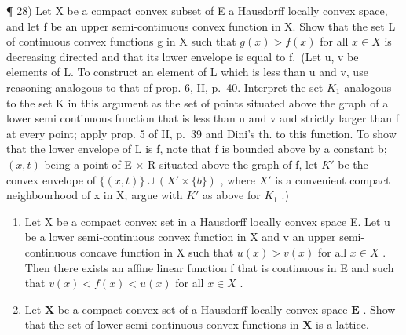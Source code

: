 ¶ 28) Let X be a compact convex subset of E a Hausdorff locally convex space, and let f be an upper semi-continuous convex function in X. Show that the set L of continuous convex functions g in X such that \(g(x) > f(x)\) for all \(x \in X\) is decreasing directed and that its lower envelope is equal to f.~(Let u, v be elements of L. To construct an element of L which is less than u and v, use reasoning analogous to that of prop. 6, II, p.~40. Interpret the set \(K_{1}\) analogous to the set K in this argument as the set of points situated above the graph of a lower semi continuous function that is less than u and v and strictly larger than f at every point; apply prop. 5 of II, p.~39 and Dini's th. to this function. To show that the lower envelope of L is f, note that f is bounded above by a constant b; \((x, t)\) being a point of E × R situated above the graph of f, let \(K'\) be the convex envelope of \(\{(x, t)\} \cup (X' \times \{b\})\) , where \(X'\) is a convenient compact neighbourhood of x in X; argue with \(K'\) as above for \(K_{1}\) .)

\begin{enumerate}
\def\labelenumi{\arabic{enumi})}
\setcounter{enumi}{28}
\item
  Let X be a compact convex set in a Hausdorff locally convex space E. Let u be a lower semi-continuous convex function in X and v an upper semi-continuous concave function in X such that \(u(x) > v(x)\) for all \(x \in X\) . Then there exists an affine linear function f that is continuous in E and such that \(v(x) < f(x) < u(x)\) for all \(x \in X\) .
\item
  Let \(\mathbf{X}\) be a compact convex set of a Hausdorff locally convex space \(\mathbf{E}\) . Show that the set of lower semi-continuous convex functions in \(\mathbf{X}\) is a lattice.
\end{enumerate}
